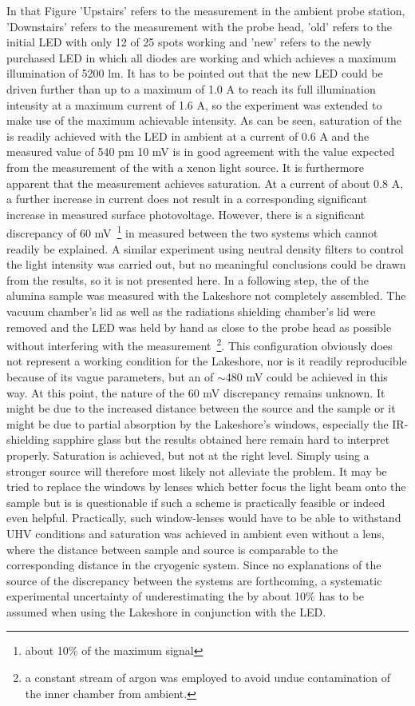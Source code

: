In that Figure 'Upstairs' refers to the measurement in the ambient probe station, 'Downstairs' refers to the measurement with the \McA{} probe head, 'old' refers to the initial LED with only 12 of 25 spots working and 'new' refers to the newly purchased LED in which all diodes are working and which achieves a maximum illumination of 5200 lm. It has to be pointed out that the new LED could be driven further than up to a maximum of 1.0 A to reach its full illumination intensity at a maximum current of 1.6 A, so the experiment was extended to make use of the maximum achievable intensity. As can be seen, saturation of the \spv{} is readily achieved with the LED in ambient at a current of 0.6 A and the measured value of 540 pm 10 mV is in good agreement with the value expected from the measurement of the \spv{} with a xenon light source. It is furthermore apparent that the measurement achieves saturation. At a current of about 0.8 A, a further increase in current does not result in a corresponding significant increase in measured surface photovoltage. However, there is a significant discrepancy of 60 mV~\footnote{about 10\% of the maximum signal} in measured \spv{} between the two systems which cannot readily be explained. A similar experiment using neutral density filters to control the light intensity was carried out, but no meaningful conclusions could be drawn from the results, so it is not presented here. In a following step, the \spv{} of the alumina sample was measured with the Lakeshore not completely assembled. The vacuum chamber's lid as well as the radiations shielding chamber's lid were removed and the LED was held by hand as close to the probe head as possible without interfering with the measurement~\footnote{a constant stream of argon was employed to avoid undue contamination of the inner chamber from ambient.}. This configuration obviously does not represent a working condition for the Lakeshore, nor is it readily reproducible because of its vague parameters, but an \spv{} of $\sim$480 mV could be achieved in this way. At this point, the nature of the 60 mV discrepancy remains unknown. It might be due to the increased distance between the source and the sample or it might be due to partial absorption by the Lakeshore's windows, especially the IR-shielding sapphire glass but the results obtained here remain hard to interpret properly. Saturation is achieved, but not at the right level. Simply using a stronger source will therefore most likely not alleviate the problem. It may be tried to replace the windows by lenses which better focus the light beam onto the sample but is is questionable if such a scheme is practically feasible or indeed even helpful. Practically, such window-lenses would have to be able to withstand UHV conditions and saturation was achieved in ambient even without a lens, where the distance between sample and source is comparable to the corresponding distance in the cryogenic system. Since no explanations of the source of the discrepancy between the systems are forthcoming, a systematic experimental uncertainty of underestimating the \spv{} by about 10\% has to be assumed when using the Lakeshore in conjunction with the LED.


